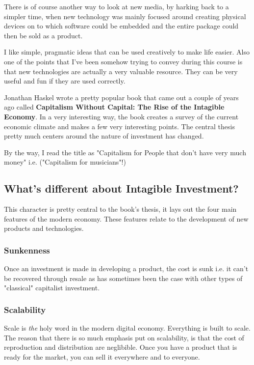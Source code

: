 \documentclass[11pt]{article}
\begin{document}
There is of course another way to look at new media, by harking back to a simpler time, 
when new technology was mainly focused around creating physical devices on to which 
software could be embedded and the entire package could then be sold as a product. 

I like simple, pragmatic ideas that can be used creatively to make life easier. 
Also one of the points that I've been somehow trying to convey during this course
is that new technologies are actually a very valuable resource. They can be very 
useful and fun if they are used correctly. 

Jonathan Haskel wrote a pretty popular book that came out a couple of years ago 
called \textbf{Capitalism Without Capital: The Rise of the Intagible Economy}. In a very 
interesting way, the book creates a survey of the current economic climate and makes 
a few very interesting points. The central thesis pretty much centers around the nature 
of investment has changed.

By the way, I read the title as "Capitalism for People that don't have very much money"
i.e. ("Capitalism for musicians"!)



\subsection{What's different about Intagible Investment?}
\label{sec:orgd8d83fa}

This character is pretty central to the book's thesis, it lays out the four main features
of the modern economy. These features relate to the development of new products and technologies.

\subsubsection{Sunkenness}
\label{sec:org0ad7b10}
Once an investment is made in developing a product, the cost is sunk i.e. it can't be recovered
through resale as has sometimes been the case with other types of "classical" capitalist investment.

\subsubsection{Scalability}
\label{sec:org8d55fdf}
Scale is \emph{the} holy word in the modern digital economy. Everything is built to scale. The reason 
that there is so much emphasis put on scalability, is that the cost of reproduction and distribution
are neglibible. Once you have a product that is ready for the market, you can sell it everywhere 
and to everyone.
\end{document}
